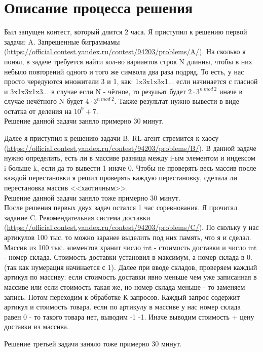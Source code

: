 \documentclass[oneside,a4paper,14pt]{extarticle} %
\begin{document}
  \section*{Описание процесса решения}
  Был запущен контест, который длится 2 часа.
  Я приступил к решению первой задачи: A. Запрещенные биграммамы
  (\url{https://official.contest.yandex.ru/contest/94203/problems/A/}).
  На сколько я понял, в задаче требуется найти кол-во вариантов строк N длинны,
  чтобы в них небыло повторений одного и того же символа два раза подряд.
  То есть, у нас просто чередуются множители 3 и 1, как: 1x3x1x3x1... если начинается с гласной
  и 3x1x3x1x3... в случае если N - чётное, то резульат будет $2 \cdot 3^{n\ mod\ 2}$
  иначе в случае нечётного N будет  $4 \cdot 3^{n\ mod\ 2}$. Также результат нужно вывести в
  виде остатка от деления на $10^9 + 7$. \\

  
  Решение данной задачи заняло примерно 30 минут.

  \newpage
  
  Далее я приступил к решению задачи B. RL-агент стремится к хаосу
  (\url{https://official.contest.yandex.ru/contest/94203/problems/B/}). 
  В данной задаче нужно определить, есть ли в массиве разница между i-ым элементом и индексом i
  больше k, если да то вывести 1 иначе 0. Чтобы не проверять весь массив после каждой  перестановки
  я решил проверять каждую перестановку, сделала ли перестановка массив <<хаотичным>>. \\

  
  Решение данной задачи заняло тоже примерно 30 минут. \\

  После решения первых двух задач остался 1 час соревнования. Я прочитал задание
  C. Рекомендательная система доставки
  (\url{https://official.contest.yandex.ru/contest/94203/problems/C/}).
  По скольку у нас артикулов 100 тыс. то можно заранее выделить под них память, что я и сделал.
  Массив из 100 тыс. элементов хранит число int - стоимость доставки и число int - номер склада.
  Стоимость доставки установил в максимум, а номер склада в 0. (так как нумерация начинается с 1).
  Далее при вводе складов, проверяем каждый артикул по массиву: если стоимость доставки явно меньше
  чем уже записанная в массиве или если стоимость такая же, но номер склада
  меньше - то заменяем запись. Потом переходим к обработке К запросов. Каждый запрос содержит артикул
  и стоимость товара. если по артикулу в массиве у нас номер склада равен 0 - то такого товара нет,
  выводим -1 -1. Иначе выводим стоимость + цену доставки из массива.
  \newpage
  
  Решение третьей задачи заняло тоже примерно 30 минут. \\
\end{document}
